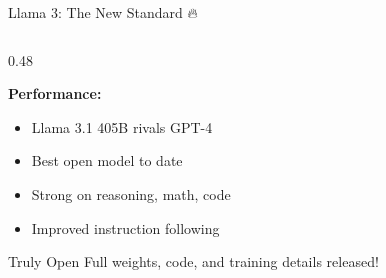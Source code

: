 \documentclass[aspectratio=169]{beamer}
\begin{document}
\begin{frame}{Llama 3: The New Standard 🔥}
\begin{columns}[T]
\begin{column}{0.48\textwidth}
\vspace{0.5em}

\textbf{Performance:}
\begin{itemize}
    \item Llama 3.1 405B rivals GPT-4
    \item Best open model to date
    \item Strong on reasoning, math, code
    \item Improved instruction following
\end{itemize}

\vspace{0.5em}

\begin{exampleblock}{Truly Open}
Full weights, code, and training details released!
\end{exampleblock}
\end{column}
\end{columns}
\end{frame}
\end{document}
